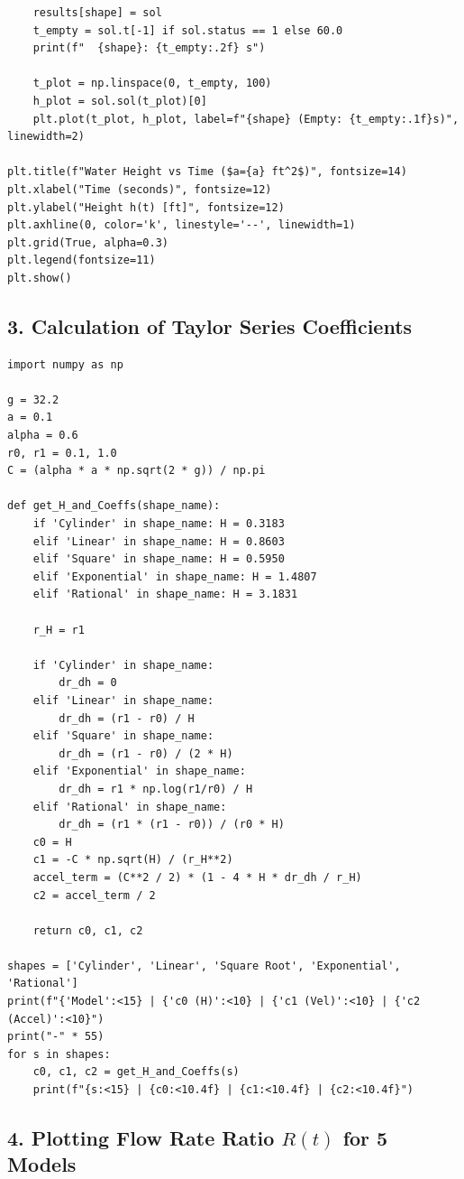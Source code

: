 \documentclass[a4paper, 12pt]{article}
\begin{document}
\begin{lstlisting}
    results[shape] = sol
    t_empty = sol.t[-1] if sol.status == 1 else 60.0
    print(f"  {shape}: {t_empty:.2f} s")

    t_plot = np.linspace(0, t_empty, 100)
    h_plot = sol.sol(t_plot)[0]
    plt.plot(t_plot, h_plot, label=f"{shape} (Empty: {t_empty:.1f}s)", linewidth=2)

plt.title(f"Water Height vs Time ($a={a} ft^2$)", fontsize=14)
plt.xlabel("Time (seconds)", fontsize=12)
plt.ylabel("Height h(t) [ft]", fontsize=12)
plt.axhline(0, color='k', linestyle='--', linewidth=1)
plt.grid(True, alpha=0.3)
plt.legend(fontsize=11)
plt.show()
\end{lstlisting}

\subsection*{3. Calculation of Taylor Series Coefficients}

\begin{lstlisting}
import numpy as np

g = 32.2
a = 0.1
alpha = 0.6
r0, r1 = 0.1, 1.0
C = (alpha * a * np.sqrt(2 * g)) / np.pi

def get_H_and_Coeffs(shape_name):
    if 'Cylinder' in shape_name: H = 0.3183
    elif 'Linear' in shape_name: H = 0.8603
    elif 'Square' in shape_name: H = 0.5950
    elif 'Exponential' in shape_name: H = 1.4807
    elif 'Rational' in shape_name: H = 3.1831

    r_H = r1 
    
    if 'Cylinder' in shape_name:
        dr_dh = 0
    elif 'Linear' in shape_name: 
        dr_dh = (r1 - r0) / H
    elif 'Square' in shape_name:
        dr_dh = (r1 - r0) / (2 * H)
    elif 'Exponential' in shape_name:
        dr_dh = r1 * np.log(r1/r0) / H
    elif 'Rational' in shape_name:
        dr_dh = (r1 * (r1 - r0)) / (r0 * H)
    c0 = H
    c1 = -C * np.sqrt(H) / (r_H**2)
    accel_term = (C**2 / 2) * (1 - 4 * H * dr_dh / r_H)
    c2 = accel_term / 2
    
    return c0, c1, c2

shapes = ['Cylinder', 'Linear', 'Square Root', 'Exponential', 'Rational']
print(f"{'Model':<15} | {'c0 (H)':<10} | {'c1 (Vel)':<10} | {'c2 (Accel)':<10}")
print("-" * 55)
for s in shapes:
    c0, c1, c2 = get_H_and_Coeffs(s)
    print(f"{s:<15} | {c0:<10.4f} | {c1:<10.4f} | {c2:<10.4f}")
\end{lstlisting}

\subsection*{4. Plotting Flow Rate Ratio $R(t)$ for 5 Models}
\end{document}
